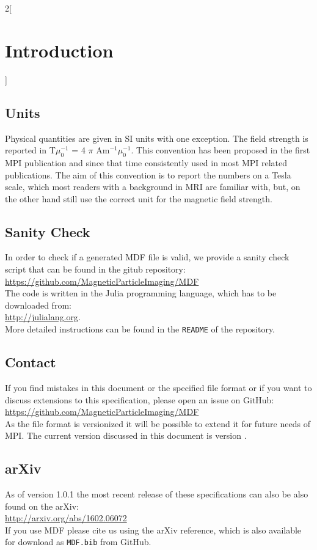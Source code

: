 \documentclass[landscape]{article} %
\begin{document}
\begin{multicols}{2}[\section{Introduction} \label{Sec:Introduction}]
\subsection{Units}

Physical quantities are given in SI units with one exception. The field strength is reported in T$\mu_0^{-1}$ = 4 $\pi$ Am$^{-1}\mu_0^{-1}$. This convention has been proposed in the first MPI publication and since that time consistently used in most MPI related publications. The aim of this convention is to report the numbers on a Tesla scale, which most readers with a background in MRI are familiar with, but, on the other hand still use the correct unit for the magnetic field strength.


\subsection{Sanity Check}

In order to check if a generated MDF file is valid, we provide a sanity check script that can be found in the gitub repository:\\
\hspace*{1cm}\url{https://github.com/MagneticParticleImaging/MDF}\\
The code is written in the Julia programming language, which has to be downloaded from: \\
\hspace*{1cm} \url{http://julialang.org}.\\
More detailed instructions can be found in the \texttt{README} of the repository.

\subsection{Contact}

If you find mistakes in this document or the specified file format or if you want to discuss extensions to this specification, please open an issue on GitHub:\\
\hspace*{1cm}\url{https://github.com/MagneticParticleImaging/MDF}\\
As the file format is versionized it will be possible to extend it for future needs of MPI. The current version discussed in this document is version \version.

\subsection{arXiv}
As of version 1.0.1 the most recent release of these specifications can also be also found on the arXiv:\\
\hspace*{1cm}\url{http://arxiv.org/abs/1602.06072}\\
If you use MDF please cite us using the arXiv reference, which is also available for download as \texttt{MDF.bib} from GitHub.

\end{multicols}
\end{document}

